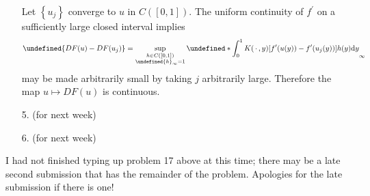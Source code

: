 \documentclass[11pt,leqno]{article}
\theoremstyle{plain}
\theoremstyle{definition}
\numberwithin{equation}{section}
\numberwithin{lem}{section}
\newcommand{\cbr}[1]{\left\{#1\right\}}
\let\norm\undefined %
\DeclarePairedDelimiter\norm{\lVert}{\rVert}
\begin{document}
\begin{enumerate}

    Let $\cbr{u_j}$ converge to $u$ in $C([0,1])$. The uniform continuity of $f^\prime$ on a sufficiently large closed interval implies
    \[\norm{DF(u)-DF(u_j)} = \sup_{\substack{h\in C([0,1])\\ \norm{h}_\infty = 1}}\norm*{\int_0^1K(\,\cdot\, ,y)[f^\prime(u(y))- f^\prime(u_j(y))]h(y)\dd y}_\infty\] may be made arbitrarily small by taking $j$ arbitrarily large. Therefore the map $u\mapsto DF(u)$ is continuous.
    \item[5.] (for next week)
    \item[6.] (for next week)
\end{enumerate}
I had not finished typing up problem 17 above at this time; there may be a late second submission that has the remainder of the problem. Apologies for the late submission if there is one!
\end{document}
